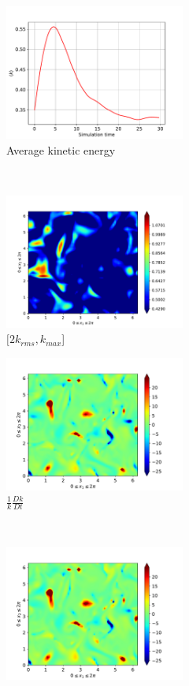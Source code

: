 \begin{figure}[H]
    \begin{subfigure}[H]{0.45\textwidth}
        \includegraphics[height=1.75in]{media/run-cds-65/ke-average1330}
        \caption{Average kinetic energy}
    \end{subfigure}
    ~
    \begin{subfigure}[H]{0.45\textwidth}
        \includegraphics[height=1.75in]{media/run-cds-65/ke-2-1330}
        \caption{$[2k_{rms}, k_{max} $] }
    \end{subfigure}
    \newline
    \begin{subfigure}[H]{0.45\textwidth}
        \includegraphics[height=1.75in]{media/run-cds-65/ke-1330}
        \caption{$\frac{1}{k} \frac{D k}{Dt}$}
    \end{subfigure}
    ~
    \begin{subfigure}{0.45\textwidth}
        \includegraphics[height=1.75in]{media/run-cds-65/A-ke-1330}

\end{subfigure}
\end{figure}
